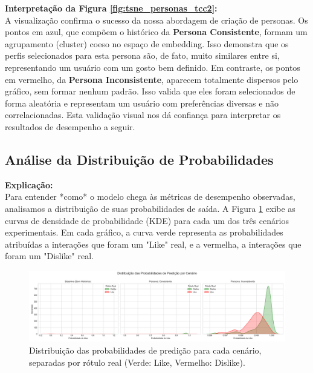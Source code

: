 \textbf{Interpretação da Figura \ref{fig:tsne_personas_tcc2}:} \\
A visualização confirma o sucesso da nossa abordagem de criação de personas. Os pontos em azul, que compõem o histórico da \textbf{Persona Consistente}, formam um agrupamento (cluster) coeso no espaço de embedding. Isso demonstra que os perfis selecionados para esta persona são, de fato, muito similares entre si, representando um usuário com um gosto bem definido. Em contraste, os pontos em vermelho, da \textbf{Persona Inconsistente}, aparecem totalmente dispersos pelo gráfico, sem formar nenhum padrão. Isso valida que eles foram selecionados de forma aleatória e representam um usuário com preferências diversas e não correlacionadas. Esta validação visual nos dá confiança para interpretar os resultados de desempenho a seguir.

\subsection{Análise da Distribuição de Probabilidades}
\textbf{Explicação:} \\
Para entender *como* o modelo chega às métricas de desempenho observadas, analisamos a distribuição de suas probabilidades de saída. A Figura \ref{fig:prob_dist_tcc2} exibe as curvas de densidade de probabilidade (KDE) para cada um dos três cenários experimentais. Em cada gráfico, a curva verde representa as probabilidades atribuídas a interações que foram um "Like" real, e a vermelha, a interações que foram um "Dislike" real.

\begin{figure}[hbt]
    \centering
    \includegraphics[width=\textwidth]{imagens/probability_distributions.png} %
    \caption{Distribuição das probabilidades de predição para cada cenário, separadas por rótulo real (Verde: Like, Vermelho: Dislike).}
    \label{fig:prob_dist_tcc2}
\end{figure}

